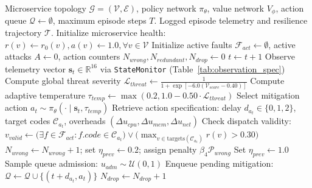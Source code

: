 \documentclass[11pt,a4paper]{article}
\begin{document}
\begin{algorithm}[!htbp]
\caption{SecChaos-RL Closed-Loop Mitigation and Healing Execution}
\label{alg:secchaos_execution}
\small
\begin{algorithmic}[1]
\Require Microservice topology $\mathcal{G} = (\mathcal{V}, \mathcal{E})$, policy network $\pi_\theta$, value network $V_\phi$, action queue $\mathcal{Q} \leftarrow \emptyset$, maximum episode steps $T$.
\Ensure Logged episode telemetry and resilience trajectory $\mathcal{T}$.
\State Initialize microservice health: $r(v) \leftarrow r_0(v), a(v) \leftarrow 1.0, \forall v \in \mathcal{V}$
\State Initialize active faults $\mathcal{F}_{act} \leftarrow \emptyset$, active attacks $A \leftarrow 0$, action counters $N_{wrong}, N_{redundant}, N_{drop} \leftarrow 0$
    \State $t \leftarrow t + 1$
    \State Observe telemetry vector $\mathbf{s}_t \in \mathbb{R}^{16}$ via \texttt{StateMonitor} (Table~\ref{tab:observation_spec})
    \State Compute global threat severity $\mathcal{L}_{threat} \leftarrow \frac{1}{1 + \exp[-6.0(\mathcal{V}_{score} - 0.40)]}$
    \State Compute adaptive temperature $\tau_{temp} \leftarrow \max(0.2, 1.0 - 0.50 \cdot \mathcal{L}_{threat})$
    \State Select mitigation action $a_t \sim \pi_\theta(\cdot \mid \mathbf{s}_t, \tau_{temp})$ 
     
        \State Retrieve action specification: delay $d_{a_t} \in \{0, 1, 2\}$, target codes $\mathcal{C}_{a_t}$, overheads $(\Delta u_{cpu}, \Delta u_{mem}, \Delta u_{net})$
        \State Check dispatch validity: $v_{valid} \leftarrow \big(\exists f \in \mathcal{F}_{act}: f.code \in \mathcal{C}_{a_t}\big) \lor \big(\max_{v \in \text{targets}(\mathcal{C}_{a_t})} r(v) > 0.30\big)$
         
            \State $N_{wrong} \leftarrow N_{wrong} + 1$; set $\eta_{prev} \leftarrow 0.2$; assign penalty $\beta_4 \mathcal{P}_{wrong}$
        \Else {}
            \State Set $\eta_{prev} \leftarrow 1.0$
            \State Sample queue admission: $u_{adm} \sim \mathcal{U}(0, 1)$ 
                \State Enqueue pending mitigation: $\mathcal{Q} \leftarrow \mathcal{Q} \cup \{(t + d_{a_t}, a_t)\}$
            \Else {}
                \State $N_{drop} \leftarrow N_{drop} + 1$ 

\end{algorithmic}
\end{algorithm}
\end{document}
